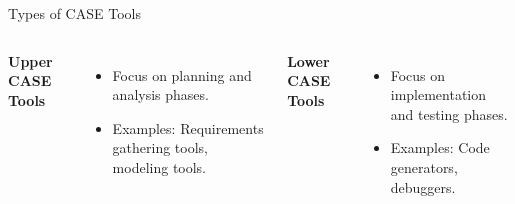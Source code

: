 \begin{frame}{Types of CASE Tools}
	\begin{columns}

		\textbf{Upper CASE Tools} \pause
		\begin{itemize}
			\item Focus on planning and analysis phases. \pause
			\item Examples: Requirements gathering tools, modeling tools. \pause
		\end{itemize}

		\textbf{Lower CASE Tools} \pause
		\begin{itemize}
			\item Focus on implementation and testing phases. \pause
			\item Examples: Code generators, debuggers. \pause
		\end{itemize}

	\end{columns}
\end{frame}


